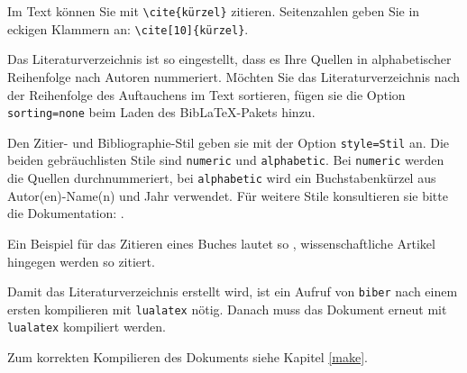 Im Text können Sie mit \verb_\cite{kürzel}_ zitieren. Seitenzahlen geben Sie in eckigen Klammern an:
\verb_\cite[10]{kürzel}_. 

Das Literaturverzeichnis ist so eingestellt, dass es Ihre Quellen in alphabetischer Reihenfolge nach Autoren nummeriert.
Möchten Sie das Literaturverzeichnis nach der Reihenfolge des Auftauchens im Text sortieren, fügen sie die Option \texttt{sorting=none} beim Laden
des BibLaTeX-Pakets hinzu.

Den Zitier- und Bibliographie-Stil geben sie mit der Option \texttt{style=Stil} an. Die beiden gebräuchlisten Stile sind \texttt{numeric} und \texttt{alphabetic}. 
Bei \texttt{numeric} werden die Quellen durchnummeriert, bei \texttt{alphabetic} wird ein Buchstabenkürzel aus Autor(en)-Name(n) und Jahr verwendet.
Für weitere Stile konsultieren sie bitte die Dokumentation: \cite{biblatex}.

Ein Beispiel für das Zitieren eines Buches lautet so \cite{handbook_adhesives},
wissenschaftliche Artikel hingegen werden so \cite{einstein} zitiert.

Damit das Literaturverzeichnis erstellt wird, ist ein Aufruf von \texttt{biber} nach einem ersten kompilieren mit \texttt{lualatex} nötig.
Danach muss das Dokument erneut mit \texttt{lualatex} kompiliert werden. 

Zum korrekten Kompilieren des Dokuments siehe Kapitel \ref{make}.
